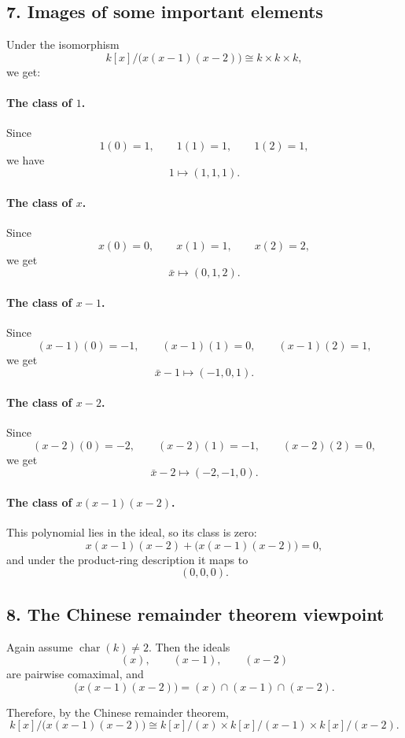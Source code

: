 \documentclass[12pt,a4paper]{article}
\theoremstyle{notespace}
\begin{document}
\subsection{7. Images of some important elements}

Under the isomorphism
\[
k[x]/\bigl(x(x-1)(x-2)\bigr)\cong k\times k\times k,
\]
we get:

\paragraph{The class of \(1\).}
Since
\[
1(0)=1,\qquad 1(1)=1,\qquad 1(2)=1,
\]
we have
\[
1\longmapsto (1,1,1).
\]

\paragraph{The class of \(x\).}
Since
\[
x(0)=0,\qquad x(1)=1,\qquad x(2)=2,
\]
we get
\[
\bar x\longmapsto (0,1,2).
\]

\paragraph{The class of \(x-1\).}
Since
\[
(x-1)(0)=-1,\qquad (x-1)(1)=0,\qquad (x-1)(2)=1,
\]
we get
\[
\bar x-1\longmapsto (-1,0,1).
\]

\paragraph{The class of \(x-2\).}
Since
\[
(x-2)(0)=-2,\qquad (x-2)(1)=-1,\qquad (x-2)(2)=0,
\]
we get
\[
\bar x-2\longmapsto (-2,-1,0).
\]

\paragraph{The class of \(x(x-1)(x-2)\).}
This polynomial lies in the ideal, so its class is zero:
\[
x(x-1)(x-2)+\bigl(x(x-1)(x-2)\bigr)=0,
\]
and under the product-ring description it maps to
\[
(0,0,0).
\]

\subsection{8. The Chinese remainder theorem viewpoint}

Again assume \(\operatorname{char}(k)\neq 2\). Then the ideals
\[
(x),\qquad (x-1),\qquad (x-2)
\]
are pairwise comaximal, and
\[
\bigl(x(x-1)(x-2)\bigr)=(x)\cap(x-1)\cap(x-2).
\]

Therefore, by the Chinese remainder theorem,
\[
k[x]/\bigl(x(x-1)(x-2)\bigr)
\cong
k[x]/(x)\times k[x]/(x-1)\times k[x]/(x-2).
\]
\end{document}
